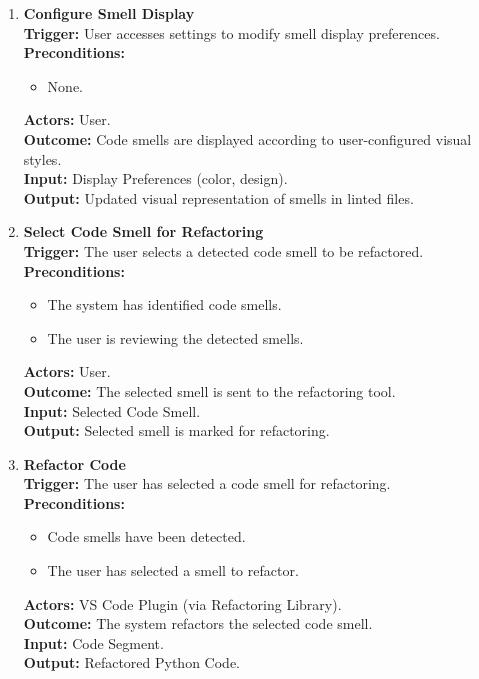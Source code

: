 \documentclass[12pt]{article}
\begin{document}
\begin{enumerate}[label={\bf PUC \arabic*:}, wide=0pt, font=\itshape]
    \item \textbf{Configure Smell Display} \\[2mm]
    \textbf{Trigger:} User accesses settings to modify smell display preferences. \\[2mm]
    \textbf{Preconditions:}
    \begin{itemize}
      \item None.
    \end{itemize}
    \textbf{Actors:} User. \\
    \textbf{Outcome:} Code smells are displayed according to user-configured visual styles. \\
    \textbf{Input:} Display Preferences (color, design). \\
    \textbf{Output:} Updated visual representation of smells in linted files.
  \item \textbf{Select Code Smell for Refactoring} \\[2mm]
    \textbf{Trigger:} The user selects a detected code smell to be refactored. \\[2mm]
    \textbf{Preconditions:}
    \begin{itemize}
      \item The system has identified code smells.
      \item The user is reviewing the detected smells.
    \end{itemize}
    \textbf{Actors:} User. \\
    \textbf{Outcome:} The selected smell is sent to the refactoring tool. \\
    \textbf{Input:} Selected Code Smell. \\
    \textbf{Output:} Selected smell is marked for refactoring.

  \item \textbf{Refactor Code} \\[2mm]
    \textbf{Trigger:} The user has selected a code smell for refactoring. \\[2mm]
    \textbf{Preconditions:}
    \begin{itemize}
      \item Code smells have been detected.
      \item The user has selected a smell to refactor.
    \end{itemize}
    \textbf{Actors:} VS Code Plugin (via Refactoring Library). \\
    \textbf{Outcome:} The system refactors the selected code smell. \\
    \textbf{Input:} Code Segment. \\
    \textbf{Output:} Refactored Python Code.


\end{enumerate}
\end{document}
